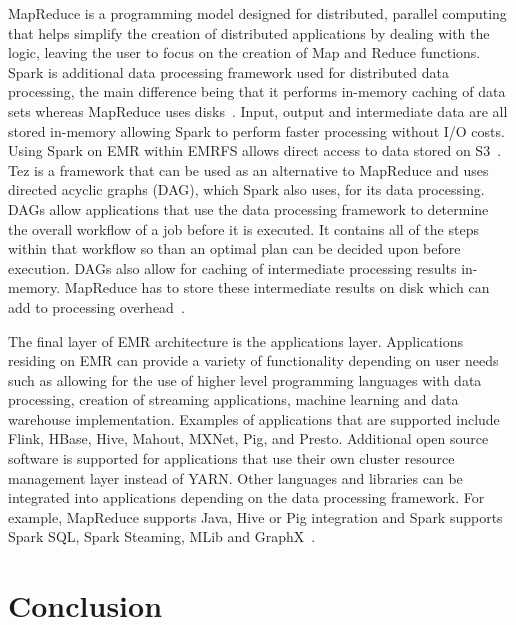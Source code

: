 MapReduce is a programming model designed for distributed, parallel computing that helps simplify the creation of distributed applications by dealing with the logic, leaving the user to focus on the creation of Map and Reduce functions. Spark is additional data processing framework used for distributed data processing, the main difference being that it performs in-memory caching of data sets whereas MapReduce uses disks~\cite{hid-sp18-521-amazonemr-arch}. Input, output and intermediate data are all stored in-memory allowing Spark to perform faster processing without I/O costs. Using Spark on EMR within EMRFS allows direct access to data stored on S3~\cite{hid-sp18-521-amazonemr-spark}. Tez is a framework that can be used as an alternative to MapReduce and uses directed acyclic graphs (DAG), which Spark also uses, for its data processing. DAGs allow applications that use the data processing framework to determine the overall workflow of a job before it is executed. It contains all of the steps within that workflow so than an optimal plan can be decided upon before execution. DAGs also allow for caching of intermediate processing results in-memory. MapReduce has to store these intermediate results on disk which can add to processing overhead~\cite{hid-sp18-521-amazonemr-tez}. 

The final layer of EMR architecture is the applications layer. Applications residing on EMR can provide a variety of functionality depending on user needs such as allowing for the use of higher level programming languages with data processing, creation of streaming applications, machine learning and data warehouse implementation. Examples of applications that are supported include Flink, HBase, Hive, Mahout, MXNet, Pig, and Presto. Additional open source software is supported for applications that use their own cluster resource management layer instead of YARN. Other languages and libraries can be integrated into applications depending on the data processing framework. For example, MapReduce supports Java, Hive or Pig integration and Spark supports Spark SQL, Spark Steaming, MLib and GraphX~\cite{hid-sp18-521-amazonemr-arch}.  

\section{Conclusion}

